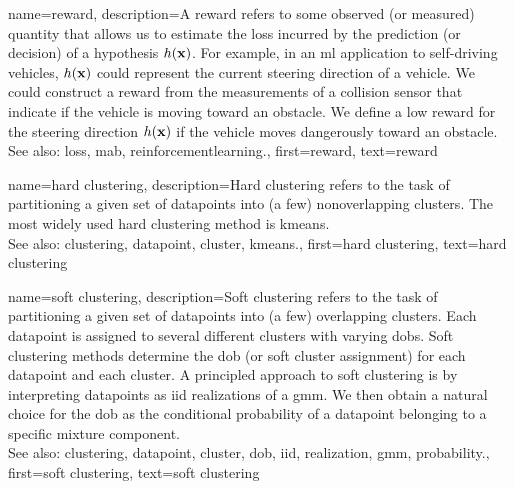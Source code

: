 {name={reward}, 
	description={A reward refers to some observed 
		(or measured) quantity that allows us to estimate the \gls{loss} incurred by the \gls{prediction} 
		(or decision) of a \gls{hypothesis} $h({\bf x})$. For example, in an 
		\gls{ml} application to self-driving vehicles, $h({\bf x})$ could represent 
		the current steering direction of a vehicle. We could construct a reward from the 
		measurements of a collision sensor that indicate if the vehicle is moving toward 
		an obstacle. We define a low reward for the steering direction 
		$h({\bf x})$ if the vehicle moves dangerously toward an obstacle.
			\\
		See also: \gls{loss}, \gls{mab}, \gls{reinforcementlearning}.},
	first={reward}, 
	text={reward}
} 

{name={hard clustering}, 
	description={Hard \gls{clustering} 
		refers to the task of partitioning a given set of \glspl{datapoint} into (a few) nonoverlapping \glspl{cluster}. 
		The most widely used hard \gls{clustering} method is \gls{kmeans}.
				\\
		See also: \gls{clustering}, \gls{datapoint}, \gls{cluster}, \gls{kmeans}.},
	first={hard clustering},
	text={hard clustering} 
}
	
{name={soft clustering}, 
	description={Soft \gls{clustering} 
		refers to the task of partitioning a given set of \glspl{datapoint} into (a few) overlapping \glspl{cluster}. 
		Each \gls{datapoint} is assigned to several different \glspl{cluster} with varying \glspl{dob}. Soft \gls{clustering} 
		methods determine the \gls{dob} (or soft \gls{cluster} assignment) for each \gls{datapoint} and each \gls{cluster}.
		A principled approach to soft \gls{clustering} is by interpreting \glspl{datapoint} as \gls{iid} \glspl{realization} 
		of a \gls{gmm}. We then obtain a natural choice for the \gls{dob} as the conditional 
		\gls{probability} of a \gls{datapoint} belonging to a specific mixture component.
				\\
		See also: \gls{clustering}, \gls{datapoint}, \gls{cluster}, \gls{dob}, \gls{iid}, \gls{realization}, \gls{gmm}, \gls{probability}.},
	first={soft clustering},
	text={soft clustering} 
}


